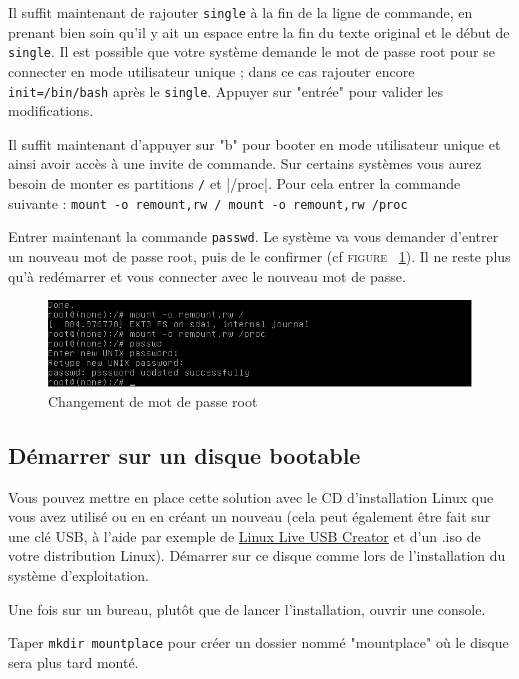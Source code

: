 Il suffit maintenant de rajouter \verb|single| à la fin de la ligne de commande, en prenant bien soin qu'il y ait un espace entre la fin du texte original et le début de \verb|single|. Il est possible que votre système demande le mot de passe root pour se connecter en mode utilisateur unique ; dans ce cas rajouter encore \verb|init=/bin/bash| après le \verb|single|. Appuyer sur "entrée" pour valider les modifications. 

Il suffit maintenant d'appuyer sur "b" pour booter en mode utilisateur unique et ainsi avoir accès à une invite de commande. Sur certains systèmes vous aurez besoin de monter es partitions \verb|/| et |/proc|. Pour cela entrer la commande suivante :
\verb|mount -o remount,rw / mount -o remount,rw /proc|

Entrer maintenant la commande \verb|passwd|. Le système va vous demander d'entrer un nouveau mot de passe root, puis de le confirmer (cf \textsc{figure ~\ref{fig:reset-linux-root-password}}). Il ne reste plus qu'à redémarrer et vous connecter avec le nouveau mot de passe.

\begin{figure}[h!]
	\centering
		\includegraphics[width=1.00\textwidth]{boot/reset-linux-root-password.png}
	\caption{Changement de mot de passe root}
	\label{fig:reset-linux-root-password}
\end{figure}

\subsection{Démarrer sur un disque bootable}
Vous pouvez mettre en place cette solution avec le CD d'installation Linux que vous avez utilisé ou en en créant un nouveau (cela peut également être fait sur une clé USB, à l'aide par exemple de \href{http://www.linuxliveusb.com/}{Linux Live USB Creator} et d'un .iso de votre distribution Linux). Démarrer sur ce disque comme lors de l'installation du système d'exploitation.

Une fois sur un bureau, plutôt que de lancer l'installation, ouvrir une console. 

Taper \verb|mkdir mountplace| pour créer un dossier nommé "mountplace" où le disque sera plus tard monté.

